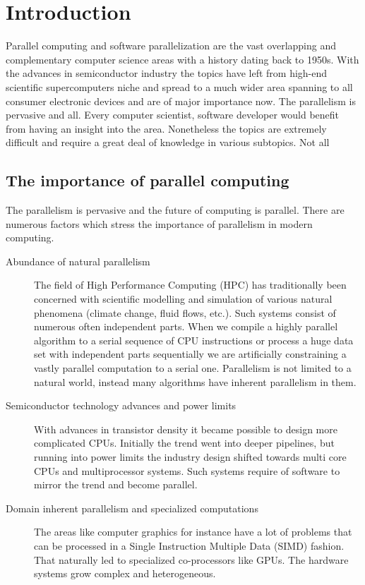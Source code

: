 \chapter{Introduction}
\quad Parallel computing and software parallelization are the vast overlapping and complementary computer science areas with a history dating back to 1950s. With the advances in semiconductor industry the topics have left from high-end scientific supercomputers niche and spread to a much wider area spanning to all consumer electronic devices and are of major importance now. The parallelism is pervasive and all. Every computer scientist, software developer would benefit from having an insight into the area. Nonetheless the topics are extremely difficult and require a great deal of knowledge in various subtopics. Not all 

\section{The importance of parallel computing}
\label{parallel_computing_importance}
\quad The parallelism is pervasive and the future of computing is parallel. There are numerous factors which stress the importance of parallelism in modern computing.   

\begin{description}
\item[Abundance of natural parallelism] The field of High Performance Computing (HPC) has traditionally been concerned with scientific modelling and simulation of various natural phenomena (climate change, fluid flows, etc.). Such systems consist of numerous often independent parts. When we compile a highly parallel algorithm to a serial sequence of CPU instructions or process a huge data set with independent parts sequentially we are artificially constraining a vastly parallel computation to a serial one. Parallelism is not limited to a natural world, instead many algorithms have inherent parallelism in them.
\item[Semiconductor technology advances and power limits] With advances in transistor density it became possible to design more complicated CPUs. Initially the trend went into deeper pipelines, but running into power limits the industry design shifted towards multi core CPUs and multiprocessor systems. Such systems require of software to mirror the trend and become parallel.
\item[Domain inherent parallelism and specialized computations] The areas like computer graphics for instance have a lot of problems that can be processed in a Single Instruction Multiple Data (SIMD) fashion. That naturally led to specialized co-processors like GPUs. The hardware systems grow complex and heterogeneous.
\end{description}


